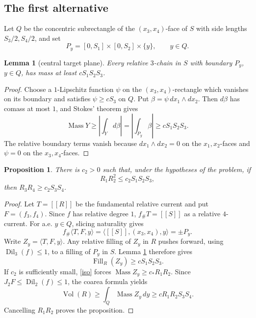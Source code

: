 \documentclass[12pt]{article}
\newtheorem{lemma}{Lemma}
\newtheorem{proposition}{Proposition}
\newcommand{\Dil}{\operatorname{Dil}}
\newcommand{\Vol}{\operatorname{Vol}}
\newcommand{\Mass}{\operatorname{Mass}}
\newcommand{\Fill}{\operatorname{Fill}}
\begin{document}
\subsection*{The first alternative}

Let \(Q\) be the concentric subrectangle of the \((x_3,x_4)\)-face of \(S\)
with side lengths \(S_3/2,S_4/2\), and set
\[
        P_y=[0,S_1]\times[0,S_2]\times\{y\},\qquad y\in Q.
\]

\begin{lemma}[central target plane]\label{central}
Every relative \(3\)-chain in \(S\) with boundary \(P_y\), \(y\in Q\), has
mass at least \(cS_1S_2S_3\).
\end{lemma}

\begin{proof}
Choose a \(1\)-Lipschitz function \(\psi\) on the
\((x_3,x_4)\)-rectangle which vanishes on its boundary and satisfies
\(\psi\ge cS_3\) on \(Q\).  Put \(\beta=\psi\,dx_1\wedge dx_2\).  Then
\(d\beta\) has comass at most \(1\), and Stokes' theorem gives
\[
\Mass Y\ge\left|\int_Yd\beta\right|
 =\left|\int_{P_y}\beta\right|\ge cS_1S_2S_3 .
\]
The relative boundary terms vanish because \(dx_1\wedge dx_2=0\) on the
\(x_1,x_2\)-faces and \(\psi=0\) on the \(x_3,x_4\)-faces.
\end{proof}

\begin{proposition}\label{firstalt}
There is \(c_2>0\) such that, under the hypotheses of the problem, if
\[
        R_1R_2^2\le c_2S_1S_2S_3 ,
\]
then \(R_3R_4\ge c_2S_3S_4\).
\end{proposition}

\begin{proof}
Let \(T=[[R]]\) be the fundamental relative current and put \(F=(f_3,f_4)\).
Since \(f\) has relative degree \(1\), \(f_\#T=[[S]]\) as a relative
\(4\)-current.  For a.e. \(y\in Q\), slicing naturality gives
\[
        f_\#\langle T,F,y\rangle
        =\langle [[S]],(x_3,x_4),y\rangle=\pm P_y .
\]
Write \(Z_y=\langle T,F,y\rangle\).  Any relative filling of \(Z_y\) in \(R\)
pushes forward, using \(\Dil_3(f)\le1\), to a filling of \(P_y\) in \(S\).
Lemma \ref{central} therefore gives
\[
        \Fill_R(Z_y)\ge cS_1S_2S_3 .
\]
If \(c_2\) is sufficiently small, \eqref{iso} forces
\(\Mass Z_y\ge c_*R_1R_2\).  Since \(J_2F\le\Dil_2(f)\le1\), the coarea
formula yields
\[
 \Vol(R)\ge\int_Q\Mass Z_y\,dy
        \ge cR_1R_2S_3S_4 .
\]
Cancelling \(R_1R_2\) proves the proposition.
\end{proof}
\end{document}
